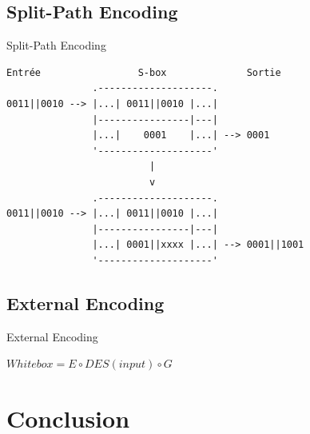\documentclass{beamer}
\begin{document}
\subsection{Split-Path Encoding}

\begin{frame}[fragile]{Split-Path Encoding}
\begin{Verbatim}[samepage=true]
    Entrée                 S-box              Sortie
               .--------------------.
0011||0010 --> |...| 0011||0010 |...|
               |----------------|---|
               |...|    0001    |...| --> 0001
               '--------------------'
                         | 
                         v
               .--------------------.
0011||0010 --> |...| 0011||0010 |...|
               |----------------|---|
               |...| 0001||xxxx |...| --> 0001||1001
               '--------------------'
\end{Verbatim}
  
\end{frame}

\subsection{External Encoding}

\begin{frame}{External Encoding}
\begin{center}
  $Whitebox = E \circ DES(input) \circ G$
\end{center}
\end{frame}

\section{Conclusion}
\end{document}
